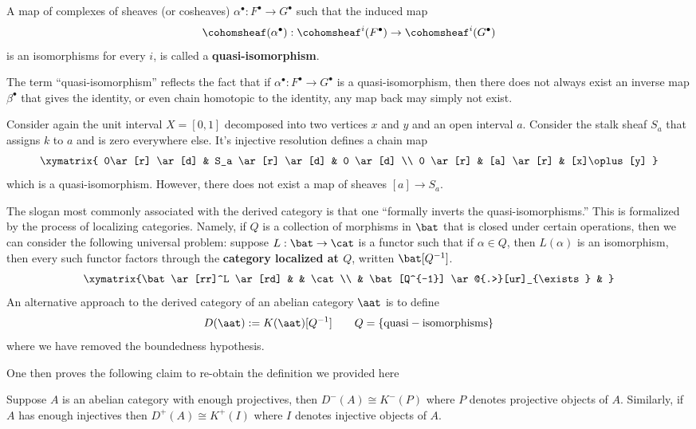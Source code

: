 \begin{defn}
	A map of complexes of sheaves (or cosheaves) $\alpha^{\bullet}:F^{\bullet}\to G^{\bullet}$ such that the induced map
	\[
		\cohomsheaf(\alpha^{\bullet}):\cohomsheaf^i(F^{\bullet})\to \cohomsheaf^i(G^{\bullet})
	\]
	is an isomorphisms for every $i$, is called a \textbf{quasi-isomorphism}.
\end{defn}
	
The term ``quasi-isomorphism'' reflects the fact that if $\alpha^{\bullet}:F^{\bullet}\to G^{\bullet}$ is a quasi-isomorphism, then there does not always exist an inverse map $\beta^{\bullet}$ that gives the identity, or even chain homotopic to the identity, any map back may simply not exist.
	
\begin{ex}\label{ex:quasi_iso}
	Consider again the unit interval $X=[0,1]$ decomposed into two vertices $x$ and $y$ and an open interval $a$. Consider the stalk sheaf $S_a$ that assigns $k$ to $a$ and is zero everywhere else. It's injective resolution defines a chain map
	\[
	\xymatrix{ 0\ar[r] \ar[d] & S_a \ar[r] \ar[d] & 0 \ar[d] \\
	0  \ar[r] & [a] \ar[r] & [x]\oplus [y] }
	\]
	which is a quasi-isomorphism. However, there does not exist a map of sheaves $[a]\to S_a$.
\end{ex}

The slogan most commonly associated with the derived category is that one ``formally inverts the quasi-isomorphisms.'' This is formalized by the process of localizing categories. Namely, if $Q$ is a collection of morphisms in $\bat$ that is closed under certain operations, then we can consider the following universal problem: suppose $L:\bat\to\cat$ is a functor such that if $\alpha\in Q$, then $L(\alpha)$ is an isomorphism, then every such functor factors through the \textbf{category localized at $Q$}, written $\bat[Q^{-1}]$.
\[
	\xymatrix{\bat \ar[rr]^L \ar[rd] & & \cat \\
	& \bat[Q^{-1}] \ar@{.>}[ur]_{\exists} & }
\]
An alternative approach to the derived category of an abelian category $\aat$ is to define
\[
	D(\aat):= K(\aat)[Q^{-1}] \qquad Q=\{\mathrm{quasi-isomorphisms}\}
\]
where we have removed the boundedness hypothesis.

One then proves the following claim to re-obtain the definition we provided here
\begin{thm}\label{thm:proj_or_inj}
	Suppose $A$ is an abelian category with enough projectives, then $D^-(A)\cong K^-(P)$ where $P$ denotes projective objects of $A$. Similarly, if $A$ has enough injectives then $D^+(A)\cong K^+(I)$ where $I$ denotes injective objects of $A$.
\end{thm}


